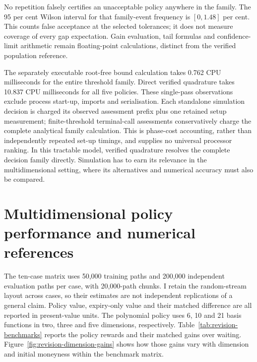 \documentclass[11pt]{article}
\begin{document}
No repetition falsely certifies an unacceptable policy anywhere in the family. The 95 per cent Wilson interval for that family-event frequency is $[0,1.48]$ per cent. This counts false acceptance at the selected tolerances; it does not measure coverage of every gap expectation. Gain evaluation, tail formulas and confidence-limit arithmetic remain floating-point calculations, distinct from the verified population reference.

The separately executable root-free bound calculation takes 0.762 CPU milliseconds for the entire threshold family. Direct verified quadrature takes 10.837 CPU milliseconds for all five policies. These single-pass observations exclude process start-up, imports and serialisation. Each standalone simulation decision is charged its observed assessment prefix plus one retained setup measurement; finite-threshold terminal-call assessments conservatively charge the complete analytical family calculation. This is phase-cost accounting, rather than independently repeated set-up timings, and supplies no universal processor ranking. In this tractable model, verified quadrature resolves the complete decision family directly. Simulation has to earn its relevance in the multidimensional setting, where its alternatives and numerical accuracy must also be compared.



\section{Multidimensional policy performance and numerical references}
\label{sec:benchmarks}

The ten-case matrix uses 50,000 training paths and 200,000 independent evaluation paths per case, with 20,000-path chunks. I retain the random-stream layout across cases, so their estimates are not independent replications of a general claim. Policy value, expiry-only value and their matched difference are all reported in present-value units. The polynomial policy uses 6, 10 and 21 basis functions in two, three and five dimensions, respectively. Table~\ref{tab:revision-benchmarks} reports the policy rewards and their matched gains over waiting. Figure~\ref{fig:revision-dimension-gains} shows how those gains vary with dimension and initial moneyness within the benchmark matrix.
\end{document}
